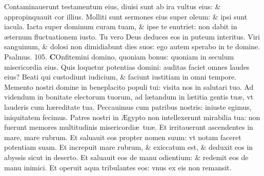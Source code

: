\documentclass[a5paper,10pt]{book}
\def\ae{æ}
\def\AE{Æ}
\begin{document}
\begin{multicols*}{2}
\newline \color{red} C\color{black}ontaminauerunt testamentum eius, diuisi sunt ab ira vultus eius: \& appropinquauit cor illius.
\newline \color{red} M\color{black}olliti sunt sermones eius super oleum: \& ipsi sunt iacula.
\newline \color{red} I\color{black}acta super dominum curam tuam, \& ipse te enutriet: non dabit in \ae ternum fluctuationem iusto.
\newline \color{red} T\color{black}u vero Deus deduces eos in puteum interitus.
\newline \color{red} V\color{black}iri sanguinum, \& dolosi non dimidiabunt dies suos: ego autem sperabo in te domine. \quad \color{red} Psalmus. \hypertarget{ps105}{105.} \color{black}
\vspace{-.5em}
\lettrine[lines=2]{\bfseries \color{red} C}{}Onfitemini domino, quoniam bonus: quoniam in seculum misericordia eius.
\newline \color{red} Q\color{black}uis loquetur potentias domini: auditas faciet omnes laudes eius?
\newline \color{red} B\color{black}eati qui custodiunt iudicium, \& faciunt iustitiam in omni tempore.
\newline \color{red} M\color{black}emento nostri domine in beneplacito populi tui: visita nos in salutari tuo.
\newline \color{red} A\color{black}d videndum in bonitate electorum tuorum, ad l\ae tandum in l\ae titia gentis tu\ae , vt lauderis cum h\ae reditate tua.
\newline \color{red} P\color{black}eccauimus cum patribus nostris: iniuste egimus, iniquitatem fecimus.
\newline \color{red} P\color{black}atres nostri in \AE gypto non intellexerunt mirabilia tua: non fuerunt memores multitudinis misericordi\ae \ tu\ae .
\newline \color{red} E\color{black}t irritauerunt ascendentes in mare, mare rubrum.
\newline \color{red} E\color{black}t saluauit eos propter nomen suum: vt notam faceret potentiam suam.
\newline \color{red} E\color{black}t increpuit mare rubrum, \& exiccatum est, \& deduxit eos in abyssis sicut in deserto.
\newline \color{red} E\color{black}t saluauit eos de manu odientium: \& redemit eos de manu inimici.
\newline \color{red} E\color{black}t operuit aqua tribulantes eos: vnus ex eis non remansit.

\end{multicols*}
\end{document}
